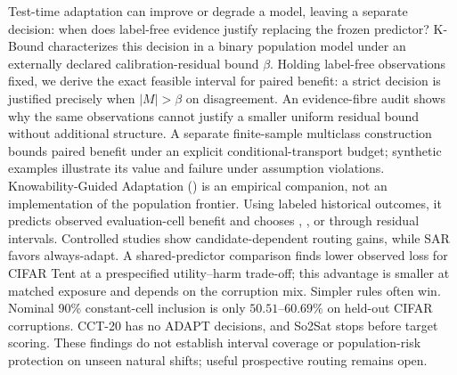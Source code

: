 Test-time adaptation can improve or degrade a model, leaving a separate decision: when does
label-free evidence justify replacing the frozen predictor? K-Bound characterizes this decision
in a binary population model under an externally declared calibration-residual bound $\beta$.
Holding label-free observations fixed, we derive the exact feasible interval for paired benefit:
a strict decision is justified precisely when $|M|>\beta$ on disagreement. An evidence-fibre audit
shows why the same observations cannot justify a smaller uniform residual bound without additional
structure. A separate finite-sample multiclass construction bounds paired benefit under an explicit
conditional-transport budget; synthetic examples illustrate its value and failure under assumption
violations. Knowability-Guided Adaptation (\KGA) is an empirical companion, not an implementation
of the population frontier. Using labeled historical outcomes, it predicts observed evaluation-cell
benefit and chooses \adapt, \freeze, or \abstain through residual intervals. Controlled studies
show candidate-dependent routing gains, while SAR favors always-adapt. A shared-predictor comparison
finds lower observed loss for CIFAR Tent at a prespecified utility--harm trade-off; this advantage
is smaller at matched exposure and depends on the corruption mix. Simpler rules often win.
Nominal 90\% constant-cell inclusion is only $50.51$--$60.69\%$ on held-out CIFAR
corruptions. CCT-20 has no ADAPT decisions, and So2Sat stops before target scoring. These findings
do not establish interval coverage or population-risk protection on unseen natural shifts; useful
prospective routing remains open.

